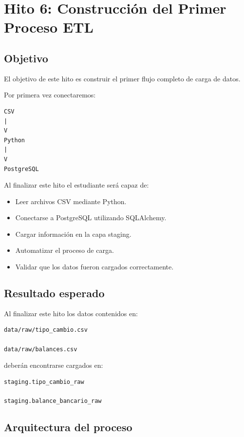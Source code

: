 \chapter{Hito 6: Construcción del Primer Proceso ETL}

\section{Objetivo}

El objetivo de este hito es construir el primer flujo completo de carga de datos.

Por primera vez conectaremos:

\begin{verbatim}
CSV
|
V
Python
|
V
PostgreSQL
\end{verbatim}

Al finalizar este hito el estudiante será capaz de:

\begin{itemize}
\item Leer archivos CSV mediante Python.
\item Conectarse a PostgreSQL utilizando SQLAlchemy.
\item Cargar información en la capa staging.
\item Automatizar el proceso de carga.
\item Validar que los datos fueron cargados correctamente.
\end{itemize}

\section{Resultado esperado}

Al finalizar este hito los datos contenidos en:

\begin{verbatim}
data/raw/tipo_cambio.csv

data/raw/balances.csv
\end{verbatim}

deberán encontrarse cargados en:

\begin{verbatim}
staging.tipo_cambio_raw

staging.balance_bancario_raw
\end{verbatim}

\section{Arquitectura del proceso}

